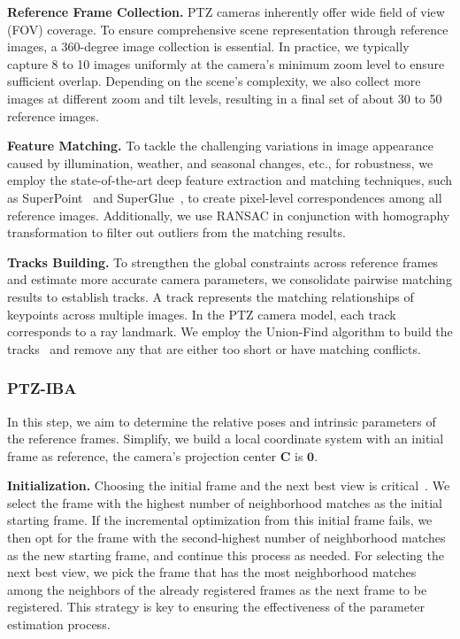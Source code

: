 \textbf{Reference Frame Collection.}
PTZ cameras inherently offer wide field of view (FOV) coverage. To ensure comprehensive scene representation through reference images, a 360-degree image collection is essential. In practice, we typically capture 8 to 10 images uniformly at the camera's minimum zoom level to ensure sufficient overlap.
Depending on the scene's complexity, we also collect more images at different zoom and tilt levels, resulting in a final set of about 30 to 50 reference images.

\textbf{Feature Matching.}
To tackle the challenging variations in image appearance caused by illumination, weather, and seasonal changes, etc., for robustness, we employ the state-of-the-art deep feature extraction and matching techniques, such as SuperPoint~\cite{detone2018superpoint} and SuperGlue~\cite{sarlin20superglue}, to create pixel-level correspondences among all reference images. Additionally, we use RANSAC in conjunction with homography transformation to filter out outliers from the matching results.

\textbf{Tracks Building.}
To strengthen the global constraints across reference frames and estimate more accurate camera parameters, we consolidate pairwise matching results to establish tracks. A track represents the matching relationships of keypoints across multiple images. In the PTZ camera model, each track corresponds to a ray landmark. We employ the Union-Find algorithm to build the tracks~\cite{moulon2012unordered} and remove any that are either too short or have matching conflicts.

\subsubsection{PTZ-IBA}

In this step, we aim to determine the relative poses and intrinsic parameters of the reference frames. 
Simplify, we build a local coordinate system with an initial frame as reference, the camera's projection center $\mathbf{C}$ is $\mathbf{0}$.

\textbf{Initialization.}
Choosing the initial frame and the next best view is critical~\cite{schoenberger2016sfm}. We select the frame with the highest number of neighborhood matches as the initial starting frame. If the incremental optimization from this initial frame fails, we then opt for the frame with the second-highest number of neighborhood matches as the new starting frame, and continue this process as needed. For selecting the next best view, we pick the frame that has the most neighborhood matches among the neighbors of the already registered frames as the next frame to be registered. This strategy is key to ensuring the effectiveness of the parameter estimation process.

